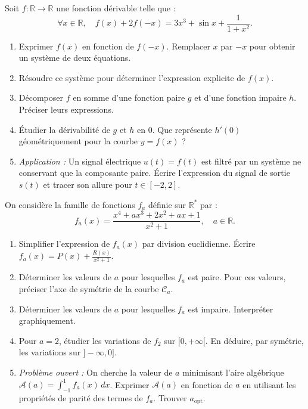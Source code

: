 \documentclass[11pt]{article}
\begin{document}
\begin{exercice}
Soit $f : \mathbb{R} \to \mathbb{R}$ une fonction dérivable telle que :
\[
\forall x \in \mathbb{R}, \quad f(x) + 2f(-x) = 3x^3 + \sin x + \frac{1}{1+x^2}.
\]
\begin{enumerate}
    \item Exprimer $f(x)$ en fonction de $f(-x)$. Remplacer $x$ par $-x$ pour obtenir un système de deux équations.
    \item Résoudre ce système pour déterminer l'expression explicite de $f(x)$.
    \item Décomposer $f$ en somme d'une fonction paire $g$ et d'une fonction impaire $h$. Préciser leurs expressions.
    \item Étudier la dérivabilité de $g$ et $h$ en $0$. Que représente $h'(0)$ géométriquement pour la courbe $y=f(x)$ ?
    \item \textit{Application :} Un signal électrique $u(t)=f(t)$ est filtré par un système ne conservant que la composante paire. Écrire l'expression du signal de sortie $s(t)$ et tracer son allure pour $t \in [-2, 2]$.
\end{enumerate}
\end{exercice}

\begin{exercice}
On considère la famille de fonctions $f_a$ définie sur $\mathbb{R}^*$ par :
\[
f_a(x) = \frac{x^4 + ax^3 + 2x^2 + ax + 1}{x^2 + 1}, \quad a \in \mathbb{R}.
\]
\begin{enumerate}
    \item Simplifier l'expression de $f_a(x)$ par division euclidienne. Écrire $f_a(x) = P(x) + \frac{R(x)}{x^2+1}$.
    \item Déterminer les valeurs de $a$ pour lesquelles $f_a$ est paire. Pour ces valeurs, préciser l'axe de symétrie de la courbe $\mathcal{C}_a$.
    \item Déterminer les valeurs de $a$ pour lesquelles $f_a$ est impaire. Interpréter graphiquement.
    \item Pour $a=2$, étudier les variations de $f_2$ sur $[0, +\infty[$. En déduire, par symétrie, les variations sur $]-\infty, 0]$.
    \item \textit{Problème ouvert :} On cherche la valeur de $a$ minimisant l'aire algébrique $\mathcal{A}(a) = \int_{-1}^{1} f_a(x) \, dx$. Exprimer $\mathcal{A}(a)$ en fonction de $a$ en utilisant les propriétés de parité des termes de $f_a$. Trouver $a_{\text{opt}}$.
\end{enumerate}
\end{exercice}
\end{document}
